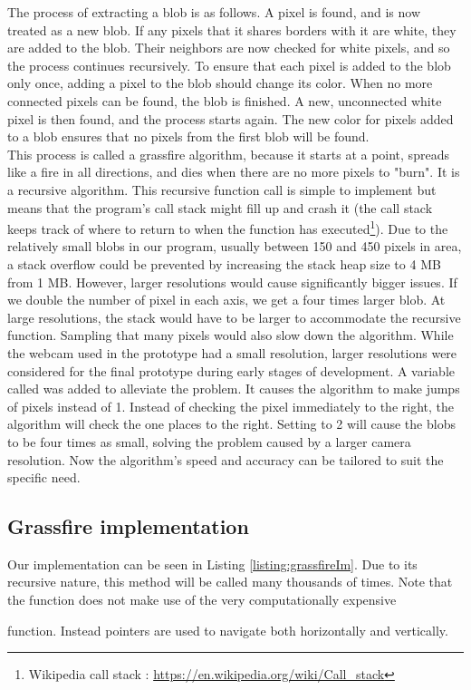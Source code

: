 {The process of extracting a blob is as follows. A pixel is found, and is now treated as a new blob. If any pixels that it shares borders with it are white, they are added to the blob. Their neighbors are now checked for white pixels, and so the process continues recursively. To ensure that each pixel is added to the blob only once, adding a pixel to the blob should change its color. When no more connected pixels can be found, the blob is finished. A new, unconnected white pixel is then found, and the process starts again. The new color for pixels added to a blob ensures that no pixels from the first blob will be found.\\
This process is called a grassfire algorithm, because it starts at a point, spreads like a fire in all directions, and dies when there are no more pixels to "burn".
It is a recursive algorithm. This recursive function call is simple to implement but means that the program's call stack might fill up and crash it (the call stack keeps track of where to return to when the function has executed\footnote{Wikipedia call stack : \url{https://en.wikipedia.org/wiki/Call_stack}}). Due to the relatively small blobs in our program, usually between 150 and 450 pixels in area, a stack overflow could be prevented by increasing the stack heap size to 4 MB from 1 MB. However, larger resolutions would cause significantly bigger issues. If we double the number of pixel in each axis, we get a four times larger blob. At large resolutions, the stack would have to be larger to accommodate the recursive function. Sampling that many pixels would also slow down the algorithm. While the webcam used in the prototype had a small resolution, larger resolutions were considered for the final prototype during early stages of development. A variable called  was added to alleviate the problem. It causes the algorithm to make jumps of  pixels instead of 1. Instead of checking the pixel immediately to the right, the algorithm will check the one  places to the right. Setting  to 2 will cause the blobs to be four times as small, solving the problem caused by a larger camera resolution. Now the algorithm's speed and accuracy can be tailored to suit the specific need.
\subsection{Grassfire implementation}
Our implementation can be seen in Listing \ref{listing:grassfireIm}. Due to its recursive nature, this method will be called many thousands of times. Note that the function does not make use of the very computationally expensive } function. Instead pointers are used to navigate both horizontally and vertically.
